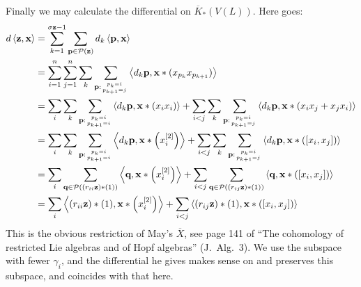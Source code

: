\documentclass[11pt]{article}
\begin{document}
Finally we may calculate the differential on $\overline{K}_*(V(L))$. Here goes:
\begin{alignat*}{2}
d\left\langle \textbf{z},\textbf{x}\right\rangle
&=
\sum_{k=1}^{\sigma\textbf{z}-1}\sum_{\textbf{p}\in\calP(\textbf{z})}d_k\left\langle \textbf{p},\textbf{x}\right\rangle%
\\
&=
\sum_{i=1}^{n}\sum_{j=1}^{n}\sum_{k}\sum_{\textbf{p}:{p_k=i\atop p_{k+1}=j}}\left\langle d_k\textbf{p},\textbf{x}*(x_{p_k}x_{p_{k+1}})\right\rangle%
\\
&=
\sum_{i}\sum_{k}\sum_{\textbf{p}:{p_k=i\atop p_{k+1}=i}}\left\langle d_k\textbf{p},\textbf{x}*(x_ix_i)\right\rangle+\sum_{i<j}\sum_{k}\sum_{\textbf{p}:{p_k=i\atop p_{k+1}=j}}\left\langle d_k\textbf{p},\textbf{x}*(x_ix_j+x_jx_i)\right\rangle%
\\
&=
\sum_{i}\sum_{k}\sum_{\textbf{p}:{p_k=i\atop p_{k+1}=i}}\left\langle d_k\textbf{p},\textbf{x}*\left(x_i^{[2]}\right)\right\rangle+\sum_{i<j}\sum_{k}\sum_{\textbf{p}:{p_k=i\atop p_{k+1}=j}}\left\langle d_k\textbf{p},\textbf{x}*\left([x_i,x_j]\right)\right\rangle%
\\
&=
\sum_{i}\sum_{\textbf{q}\in\calP((r_{ii}\textbf{z})*(1))}\left\langle \textbf{q},\textbf{x}*\left(x_i^{[2]}\right)\right\rangle+\sum_{i<j} \sum_{\textbf{q}\in\calP((r_{ij}\textbf{z})*(1))}\left\langle \textbf{q},\textbf{x}*\left([x_i,x_j]\right)\right\rangle%
\\
&=
\sum_{i}\left\langle (r_{ii}\textbf{z})*(1),\textbf{x}*\left(x_i^{[2]}\right)\right\rangle+\sum_{i<j} \left\langle (r_{ij}\textbf{z})*(1),\textbf{x}*\left([x_i,x_j]\right)\right\rangle%
\end{alignat*}
This is the obvious restriction of May's $\overline{X}$, see page 141 of ``The cohomology of restricted Lie algebras and of Hopf algebras'' (J.\ Alg.\ 3). We use the subspace with fewer $\gamma_i$, and the differential he gives makes sense on and preserves this subspace, and coincides with that here.
\end{document}
